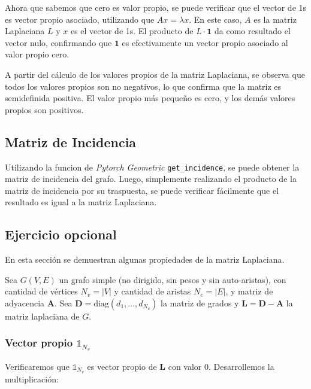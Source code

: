 \documentclass{article}
\begin{document}
Ahora que sabemos que cero es valor propio, se puede verificar que el vector de 1s es vector propio asociado, utilizando que $Ax = \lambda x$. En este caso, $A$ es la matriz Laplaciana $L$ y $x$ es el vector de 1s. El producto de $L \cdot \mathbf{1}$ da como resultado el vector nulo, confirmando que $\mathbf{1}$ es efectivamente un vector propio asociado al valor propio cero.

A partir del cálculo de los valores propios de la matriz Laplaciana, se observa que todos los valores propios son no negativos, lo que confirma que la matriz es semidefinida positiva. El valor propio más pequeño es cero, y los demás valores propios son positivos.

\subsection{Matriz de Incidencia}
Utilizando la funcion de \textit{Pytorch Geometric} \verb|get_incidence|, se puede obtener la matriz de incidencia del grafo. Luego, simplemente realizando el producto de la matriz de incidencia por su traspuesta, se puede verificar fácilmente que el resultado es igual a la matriz Laplaciana.

\subsection{Ejercicio opcional} \label{subsec:opcional}

En esta sección se demuestran algunas propiedades de la matriz Laplaciana.

\newcommand{\ones}[1]{\mathbb{1}_{#1}}
\newcommand{\lap}{\mathbf{L}}
\newcommand{\diag}{\mathbf{D}}
\newcommand{\adj}{\mathbf{A}}
\newcommand{\bm}{\tilde{\mathbf{B}}}
\newcommand{\x}{\mathbf{x}}

Sea $G(V,E)$ un grafo simple (no dirigido, sin pesos y sin auto-aristas), con cantidad de vértices $N_v = |V|$ y cantidad de aristas $N_e = |E|$, y matriz de adyacencia $\mathbf{A}$. Sea $\mathbf{D} = \text{diag}(d_{1},\dots, d_{N_v})$ la matriz de grados y $\mathbf{L}=\mathbf{D}- \mathbf{A}$ la matriz laplaciana de $G$.

\subsubsection{Vector propio $\ones{N_v}$}
\label{subsec:vector_propio_1}

Verificaremos que $\ones{N_v}$ es vector propio de $\lap$ con valor 0. Desarrollemos la multiplicación:
\end{document}
